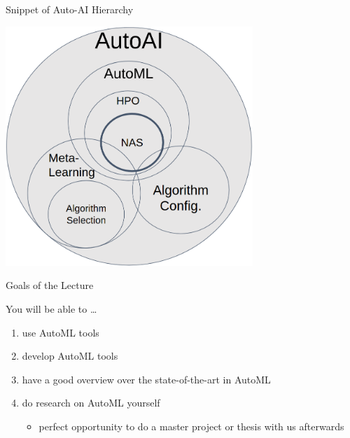 \begin{frame}[c]{Snippet of Auto-AI Hierarchy}

\centering
\includegraphics[width=0.7\textwidth]{images/autoai}

\end{frame}
\begin{frame}[c]{Goals of the Lecture}

You will be able to \ldots
\begin{enumerate}
  \item use AutoML tools
  \smallskip
  \item develop AutoML tools
  \smallskip
  \item have a good overview over the state-of-the-art in AutoML
  \smallskip
  \item do research on AutoML yourself
  \begin{itemize}
    \item perfect opportunity to do a master project or thesis with us afterwards
  \end{itemize}
\end{enumerate}

\end{frame}

